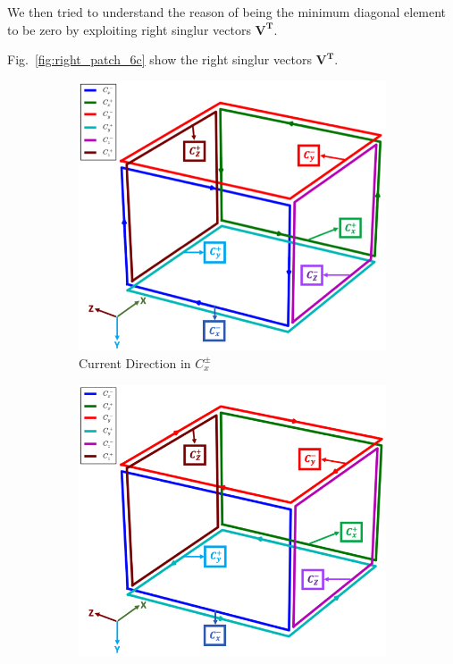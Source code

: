 We then tried to understand the reason of being the minimum diagonal element to be zero by exploiting right singlur vectors $\bm{V^T}$.


Fig.~\ref{fig:right_patch_6c} show the right singlur vectors $\bm{V^T}$.

\begin{figure}
    \begin{subfigure}{.5\linewidth}
        \centering
        \includegraphics[scale=.28]{Images/c1}
        \caption{Current Direction in $C_x^{\pm}$}
        \label{fig:c1}
    \end{subfigure}%
    \begin{subfigure}{.5\linewidth}
        \centering
        \includegraphics[scale=.28]{Images/c3}

\end{subfigure}
\end{figure}
